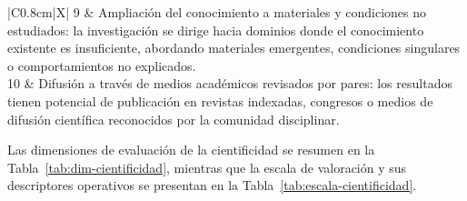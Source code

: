 \begin{table}[htbp]
\begin{tabularx}{\textwidth}{|C{0.8cm}|X|}
9 & Ampliación del conocimiento a materiales y condiciones no estudiados: la investigación se dirige hacia dominios donde el conocimiento existente es insuficiente, abordando materiales emergentes, condiciones singulares o comportamientos no explicados. \\ \hline
{}
10 & Difusión a través de medios académicos revisados por pares: los resultados tienen potencial de publicación en revistas indexadas, congresos o medios de difusión científica reconocidos por la comunidad disciplinar. \\ \hline
\end{tabularx}
\end{table}

Las dimensiones de evaluación de la cientificidad se resumen en la Tabla~\ref{tab:dim-cientificidad}, mientras que la escala de valoración y sus descriptores operativos se presentan en la Tabla~\ref{tab:escala-cientificidad}.
